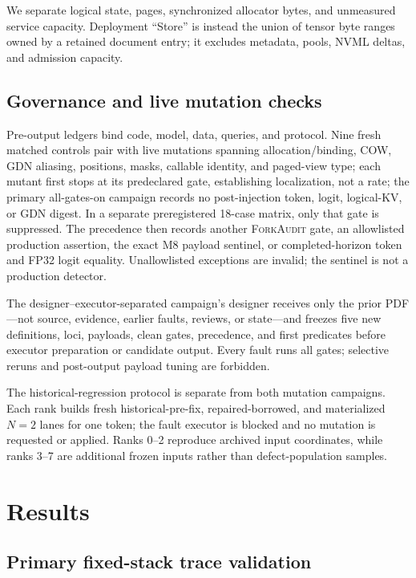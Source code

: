 \documentclass{article}
\newcommand{\method}{\textsc{ForkAudit}}
\begin{document}
We separate logical state, pages, synchronized allocator bytes, and unmeasured
service capacity.  Deployment ``Store'' is instead the union of tensor byte
ranges owned by a retained document entry; it excludes metadata, pools, NVML
deltas, and admission capacity.

\subsection{Governance and live mutation checks}

Pre-output ledgers bind code, model, data, queries, and protocol.  Nine fresh
matched controls pair with live mutations spanning allocation/binding, COW,
GDN aliasing, positions, masks, callable identity, and paged-view type; each
mutant first stops at its predeclared gate, establishing localization, not a
rate; the primary all-gates-on campaign records no post-injection token, logit,
logical-KV, or GDN digest.  In
a separate preregistered 18-case matrix, only that gate is suppressed.
The precedence then records another \method{} gate, an allowlisted production
assertion, the exact M8 payload sentinel, or completed-horizon token and FP32
logit equality.  Unallowlisted exceptions are invalid; the sentinel is not a
production detector.

The designer--executor-separated campaign's designer receives only the prior PDF---not
source, evidence, earlier faults, reviews, or state---and freezes five new
definitions, loci, payloads, clean gates, precedence, and first predicates
before executor preparation or candidate output.  Every fault runs all gates;
selective reruns and post-output payload tuning are forbidden.

The historical-regression protocol is separate from both mutation campaigns.
Each rank builds fresh historical-pre-fix, repaired-borrowed, and materialized
$N=2$ lanes for one token; the fault executor is blocked and no mutation is
requested or applied.  Ranks 0--2 reproduce archived input coordinates, while
ranks 3--7 are additional frozen inputs rather than defect-population samples.

\section{Results}
\label{sec:results}

\subsection{Primary fixed-stack trace validation}
\end{document}
